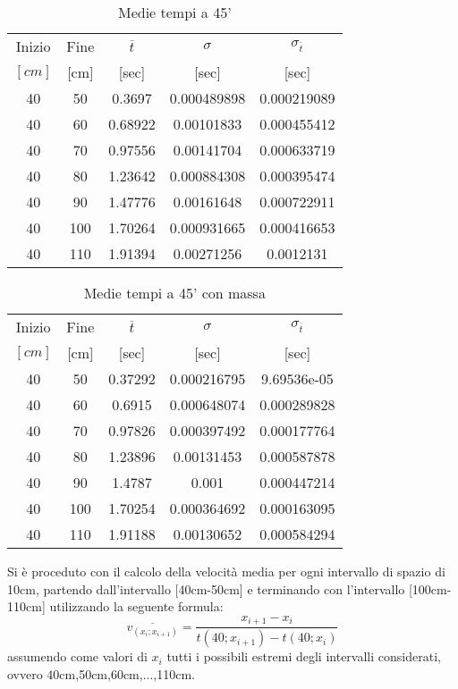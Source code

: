 \documentclass[a4paper,11pt,oneside]{article}
\begin{document}
\begin{table}[h!]
\centering
\begin{tabular}{cc|ccc}
\toprule
Inizio&Fine&$\overline{t}$&$\sigma$&$\sigma_{\overline{t}}$\\
$[\si{cm}]$&[cm]&[sec]&[sec]&[sec]\\
\midrule
40 & 50  & 0.3697  & 0.000489898 & 0.000219089 \\
40 & 60  & 0.68922 & 0.00101833  & 0.000455412 \\
40 & 70  & 0.97556 & 0.00141704  & 0.000633719 \\
40 & 80  & 1.23642 & 0.000884308 & 0.000395474 \\
40 & 90  & 1.47776 & 0.00161648  & 0.000722911 \\
40 & 100 & 1.70264 & 0.000931665 & 0.000416653 \\
40 & 110 & 1.91394 & 0.00271256  & 0.0012131 \\
\bottomrule
\end{tabular}
    \caption{Medie tempi a 45'}
    \label{tab:45_primi}
\end{table}

\begin{table}[h!]
\centering
\begin{tabular}{cc|ccc}
\toprule
Inizio&Fine&$\overline{t}$&$\sigma$&$\sigma_{\overline{t}}$\\
$[\si{cm}]$&[cm]&[sec]&[sec]&[sec]\\
\midrule
40 & 50  & 0.37292 & 0.000216795 & 9.69536e-05 \\
40 & 60  & 0.6915  & 0.000648074 & 0.000289828 \\
40 & 70  & 0.97826 & 0.000397492 & 0.000177764 \\
40 & 80  & 1.23896 & 0.00131453  & 0.000587878 \\
40 & 90  & 1.4787  & 0.001       & 0.000447214 \\
40 & 100 & 1.70254 & 0.000364692 & 0.000163095 \\
40 & 110 & 1.91188 & 0.00130652  & 0.000584294 \\
\bottomrule
\end{tabular}
    \caption{Medie tempi a 45' con massa}
    \label{tab:d45_primi}
\end{table}


Si è proceduto con il calcolo della velocità media per ogni intervallo di spazio di 10cm, partendo dall'intervallo [40cm-50cm] e terminando con l'intervallo [100cm-110cm] utilizzando la seguente formula:
\begin{equation*}
    \overline{v_{(x_i;x_{i+1})}}=\frac{x_{i+1}-x_i}{t(40;x_{i+1})-t(40;x_i)}
\end{equation*}
assumendo come valori di $x_i$ tutti i possibili estremi degli intervalli considerati, ovvero 40cm,50cm,60cm,...,110cm.
\end{document}
